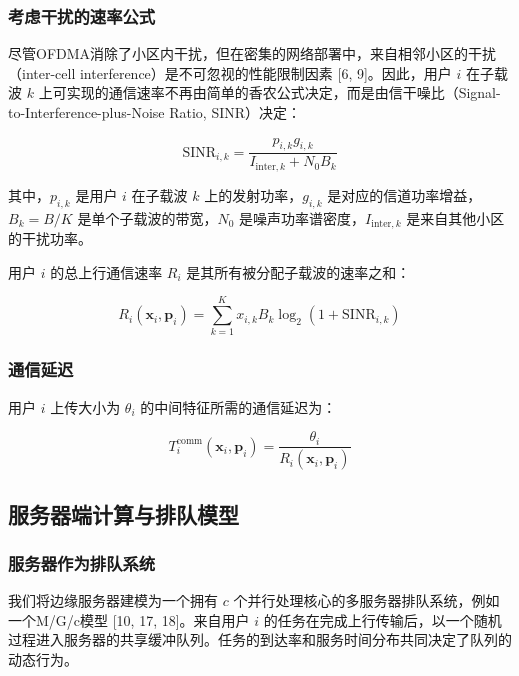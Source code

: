 \documentclass[11pt, a4paper]{article}
\begin{document}
\subsubsection{考虑干扰的速率公式}

尽管OFDMA消除了小区内干扰，但在密集的网络部署中，来自相邻小区的干扰（inter-cell interference）是不可忽视的性能限制因素 [6, 9]。因此，用户 $i$ 在子载波 $k$ 上可实现的通信速率不再由简单的香农公式决定，而是由信干噪比（Signal-to-Interference-plus-Noise Ratio, SINR）决定：

\begin{equation}
\text{SINR}_{i,k} = \frac{p_{i,k} g_{i,k}}{I_{\text{inter},k} + N_0 B_k}
\end{equation}

其中，$p_{i,k}$ 是用户 $i$ 在子载波 $k$ 上的发射功率，$g_{i,k}$ 是对应的信道功率增益，$B_k = B/K$ 是单个子载波的带宽，$N_0$ 是噪声功率谱密度，$I_{\text{inter},k}$ 是来自其他小区的干扰功率。

用户 $i$ 的总上行通信速率 $R_i$ 是其所有被分配子载波的速率之和：

\begin{equation}
R_i(\mathbf{x}_i, \mathbf{p}_i) = \sum_{k=1}^K x_{i,k} B_k \log_2(1 + \text{SINR}_{i,k})
\end{equation}

\subsubsection{通信延迟}

用户 $i$ 上传大小为 $\theta_i$ 的中间特征所需的通信延迟为：

\begin{equation}
T_i^{\text{comm}}(\mathbf{x}_i, \mathbf{p}_i) = \frac{\theta_i}{R_i(\mathbf{x}_i, \mathbf{p}_i)}
\end{equation}

\subsection{服务器端计算与排队模型}

\subsubsection{服务器作为排队系统}

我们将边缘服务器建模为一个拥有 $c$ 个并行处理核心的多服务器排队系统，例如一个M/G/c模型 [10, 17, 18]。来自用户 $i$ 的任务在完成上行传输后，以一个随机过程进入服务器的共享缓冲队列。任务的到达率和服务时间分布共同决定了队列的动态行为。
\end{document}
